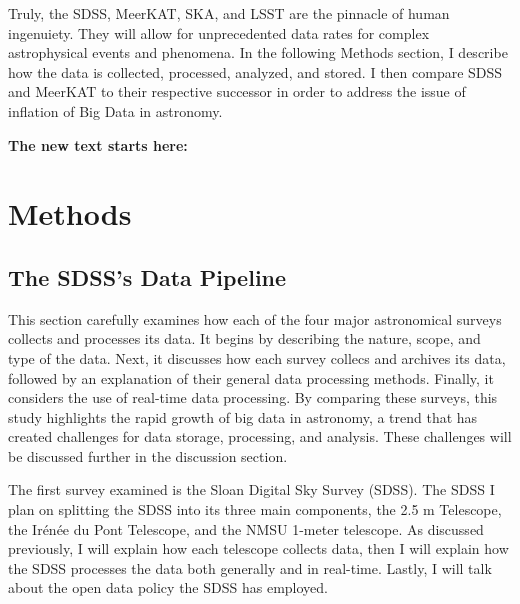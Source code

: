 \documentclass[preprint,linenumbers, longauthor]{aastex631}
\begin{document}
Truly, the SDSS, MeerKAT, SKA, and LSST are the pinnacle of human ingenuiety. They will allow for unprecedented data rates for complex astrophysical events and phenomena.
In the following Methods section, I describe how the data is collected, processed, analyzed, and stored. I then compare SDSS and MeerKAT to their respective successor in order to address the issue of inflation of Big Data in astronomy.

\textbf{The new text starts here:}

\section{Methods}


\subsection{The SDSS's Data Pipeline}

This section carefully examines how each of the four major astronomical surveys collects and processes its data. 
It begins by describing the nature, scope, and type of the data. 
Next, it discusses how each survey collecs and archives its data, followed by an explanation of their general data processing methods. 
Finally, it considers the use of real-time data processing. 
By comparing these surveys, this study highlights the rapid growth of big data in astronomy, a trend that has created challenges for data storage, processing, and analysis. 
These challenges will be discussed further in the discussion section.

The first survey examined is the Sloan Digital Sky Survey (SDSS). The SDSS I plan on splitting  the SDSS into its three main components, the 2.5 m Telescope, the Irénée du Pont Telescope, and the NMSU 1-meter telescope.
As discussed previously, I will explain how each telescope collects data, then I will explain how the SDSS processes the data both generally and in real-time. 
Lastly, I will talk about the open data policy the SDSS has employed.
\end{document}
